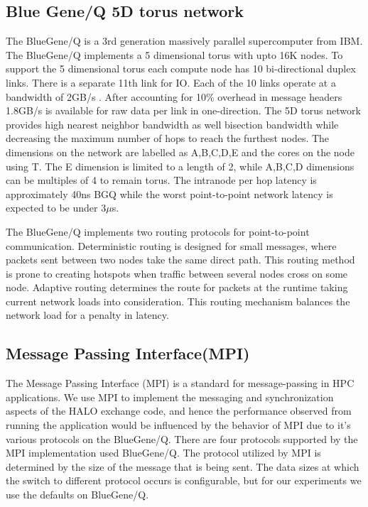 \documentclass[conference,10pt]{IEEEtran}
\begin{document}
\subsection{Blue Gene/Q 5D torus network}

The BlueGene/Q is a 3rd generation massively parallel supercomputer from IBM. The BlueGene/Q implements a 5 dimensional torus with upto 16K nodes.
To support the 5 dimensional torus each compute node has 10 bi-directional duplex links. There is a separate 11th link for IO. Each of the 10 links
operate at a bandwidth of 2GB/s \cite{BGQ_RedBook_2013}. After accounting for 10\% overhead in message headers 1.8GB/s is available for raw data per link in one-direction.
The 5D torus network provides high nearest neighbor bandwidth as well bisection bandwidth while decreasing the maximum number of hops to reach
the furthest nodes. The dimensions on the network are labelled as A,B,C,D,E and the cores on the node using T. The E dimension is limited to a length
of 2, while A,B,C,D dimensions can be multiples of 4 to remain torus. The intranode per hop latency is approximately 40ns BGQ \cite{BGQ_Interconnect_2012}
while the worst point-to-point network latency is expected to be under 3$\mu$s. 

The BlueGene/Q implements two routing protocols for point-to-point communication.
Deterministic routing is designed for small messages, where packets sent between two nodes take the same direct path.
This routing method is prone to creating hotspots when traffic between several nodes cross on some node.
Adaptive routing determines the route for packets at the runtime taking current network loads into consideration.
This routing mechanism balances the network load for a penalty in latency.


\subsection{Message Passing Interface(MPI)}
The Message Passing Interface (MPI) is a standard for message-passing in HPC applications.
We use MPI to implement the messaging and synchronization aspects of the HALO exchange code,
and hence the performance observed from running the application would be influenced by the behavior of MPI due to it's various protocols on the BlueGene/Q.
There are four protocols supported by the MPI implementation used BlueGene/Q.
The protocol utilized by MPI is determined by the size of the message that is being sent.
The data sizes at which the switch to different protocol occurs is configurable, but for our experiments we use the defaults on BlueGene/Q.
\end{document}
